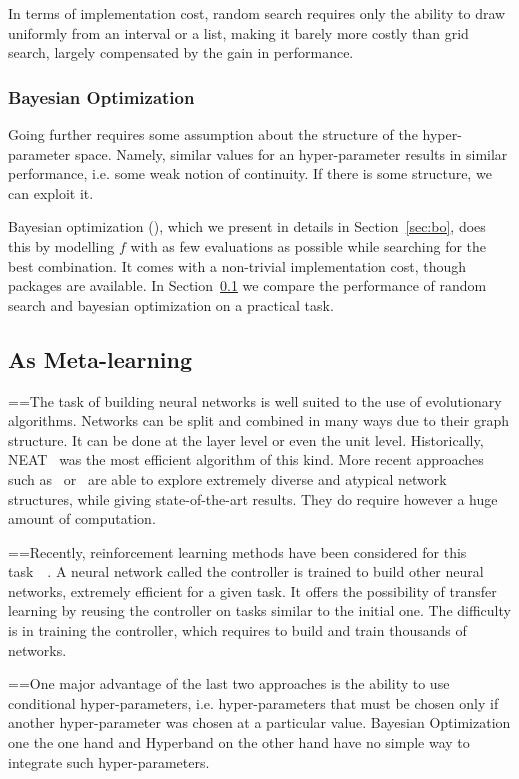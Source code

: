 In terms of implementation cost, random search requires only the ability to draw uniformly from an interval or a list, making it barely more costly than grid search, largely compensated by the gain in performance.

\subsubsection{Bayesian Optimization}

Going further requires some assumption about the structure of the hyper-parameter space. Namely, similar values for an hyper-parameter results in similar performance, i.e. some weak notion of continuity. If there is some structure, we can exploit it.

Bayesian optimization (\textcite{bergstra2011NIPS}), which we present in details in Section~\ref{sec:bo}, does this by modelling $f$ with as few evaluations as possible while searching for the best combination. It comes with a non-trivial implementation cost, though packages are available. In Section~\ref{} we compare the performance of random search and bayesian optimization on a practical task.

\subsection{As Meta-learning}

==The task of building neural networks is well suited to the use of evolutionary algorithms. Networks can be split and combined in many ways due to their graph structure. It can be done at the layer level or even the unit level. Historically, NEAT~\cite{stanley2002EC} was the most efficient algorithm of this kind. More recent approaches such as~\cite{real2017ICML} or~\cite{miikkulainen2017} are able to explore extremely diverse and atypical network structures, while giving state-of-the-art results. They do require however a huge amount of computation.

==Recently, reinforcement learning methods have been considered for this task~\cite{baker2017ICLR}~\cite{zoph2017ICLR}. A neural network called the controller is trained to build other neural networks, extremely efficient for a given task. It offers the possibility of transfer learning by reusing the controller on tasks similar to the initial one. The difficulty is in training the controller, which requires to build and train thousands of networks. 

==One major advantage of the last two approaches is the ability to use conditional hyper-parameters, i.e. hyper-parameters that must be chosen only if another hyper-parameter was chosen at a particular value. Bayesian Optimization one the one hand and Hyperband on the other hand have no simple way to integrate such hyper-parameters.

